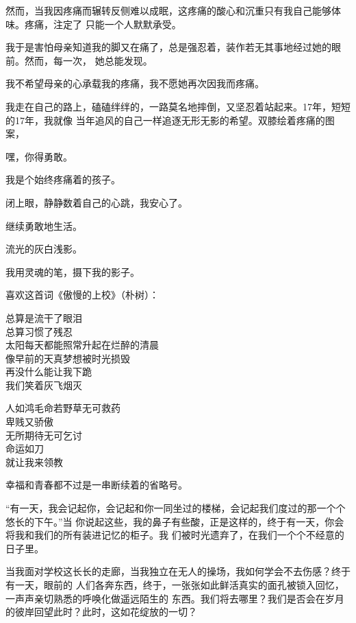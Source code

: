 		然而，当我因疼痛而辗转反侧难以成眠，这疼痛的酸心和沉重只有我自己能够体味。疼痛，注定了
	只能一个人默默承受。

		我于是害怕母亲知道我的脚又在痛了，总是强忍着，装作若无其事地经过她的眼前。然而，每一次，
	她总能发现。

		我不希望母亲的心承载我的疼痛，我不愿她再次因我而疼痛。

		我走在自己的路上，磕磕绊绊的，一路莫名地摔倒，又坚忍着站起来。17年，短短的17年，我就像
	当年追风的自己一样追逐无形无影的希望。双膝绘着疼痛的图案，

		嘿，你得勇敢。

		我是个始终疼痛着的孩子。

		\vspace{1em}
		闭上眼，静静数着自己的心跳，我安心了。\par
		继续勇敢地生活。

		\vspace{1em}
		流光的灰白浅影。\par
		我用灵魂的笔，摄下我的影子。

		\vspace{1em}
		喜欢这首词《傲慢的上校》（朴树）：

		\longpoem{}{}{}
			总算是流干了眼泪 \\
			总算习惯了残忍 \\
			太阳每天都能照常升起在烂醉的清晨 \\
			像早前的天真梦想被时光损毁 \\
			再没什么能让我下跪 \\
			我们笑着灰飞烟灭

			人如鸿毛命若野草无可救药 \\
			卑贱又骄傲 \\
			无所期待无可乞讨 \\
			命运如刀 \\
			就让我来领教
		\endlongpoem

	\endwriting



		幸福和青春都不过是一串断续着的省略号。

		\vspace{1em}
		“有一天，我会记起你，会记起和你一同坐过的楼梯，会记起我们度过的那一个个悠长的下午。”当
	你说起这些，我的鼻子有些酸，正是这样的，终于有一天，你会将我和我们的所有装进记忆的柜子。我
	们被时光遗弃了，在我们一个个不经意的日子里。

		当我面对学校这长长的走廊，当我独立在无人的操场，我如何学会不去伤感？终于有一天，眼前的
	人们各奔东西，终于，一张张如此鲜活真实的面孔被锁入回忆，一声声亲切熟悉的呼唤化做遥远陌生的
	东西。我们将去哪里？我们是否会在岁月的彼岸回望此时？此时，这如花绽放的一切？

